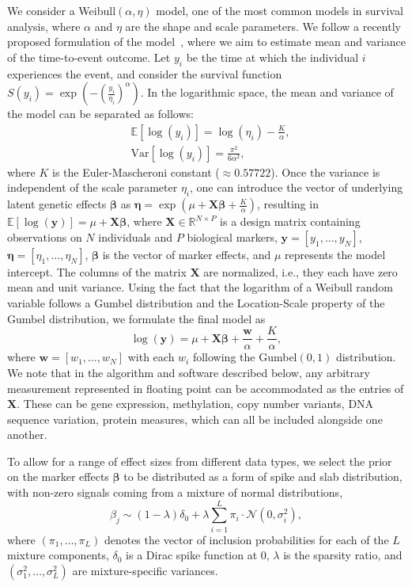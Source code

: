 We consider a Weibull$(\alpha, \eta)$ model, one of the most common models in survival analysis, where $\alpha$ and $\eta$ are the shape and scale parameters. We follow a recently proposed formulation of the model~\cite{Ojavee2021-zu}, where we aim to estimate mean and variance of the time-to-event outcome. Let $y_i$ be the time at which the individual $i$ experiences the event, and consider the survival function $S(y_i) = \exp(-(\frac{y_i}{\eta_i})^{\alpha})$. In the logarithmic space, the mean and variance of the model can be separated as follows:
\begin{align}
    & \mathbb{E}[\log(y_i)] = \log(\eta_i) - \frac{K}{\alpha}, \\
    & \text{Var}[\log(y_i)] = \frac{\pi^2}{6 \alpha^2},
\end{align}
where $K$ is the Euler-Mascheroni constant ($\approx 0.57722$). Once the variance is independent of the scale parameter $\eta_i$, one can introduce the vector of underlying latent genetic effects $\bm{\beta}$ as $\bm{\eta} = \exp(\mu + \bm{X} \bm{\beta} + \frac{K}{\alpha})$, resulting in $\mathbb{E}[\log(\bm{y})] = \mu + \bm{X} \bm{\beta}$, where $\bm{X} \in \mathbb{R}^{N \times P}$ is a design matrix containing observations on $N$ individuals and $P$ biological markers, $\bm{y}=[y_1, \ldots, y_N]$, $\bm{\eta}=[\eta_1, \ldots, \eta_N]$, $\bm{\beta}$ is the vector of marker effects, and $\mu$ represents the model intercept. The columns of the matrix $\bm{X}$ are normalized, i.e., they each have zero mean and unit variance. Using the fact that the logarithm of a Weibull random variable follows a Gumbel distribution and the Location-Scale property of the Gumbel distribution, we formulate the final model as
\begin{equation}
    \label{eq:vampW_model}
    \log (\bm{y} )=\mu + \bm{X} \bm{\beta} + \frac{\bm{w}}{\alpha} + \frac{K}{\alpha}, 
\end{equation}
where $\bm{w} = [w_1, \dots, w_N]$ with each $w_i$ following the Gumbel$(0,1)$ distribution. We note that in the algorithm and software described below, any arbitrary measurement represented in floating point can be accommodated as the entries of $\bm{X}$. These can be gene expression, methylation, copy number variants, DNA sequence variation, protein measures, which can all be included alongside one another. 

To allow for a range of effect sizes from different data types, we select the prior on the marker effects $\bm{\beta}$ to be distributed as a form of spike and slab distribution, with non-zero signals coming from a mixture of normal distributions,
\begin{equation}
\label{eq:prior}
    \beta_j \sim ( 1 - \lambda ) \delta_0 + \lambda \sum^L_{i=1} \pi_i \cdot \mathcal{N}(0, \sigma^2_i),
\end{equation}
where $(\pi_1, \dots, \pi_L)$ denotes the vector of inclusion probabilities for each of the $L$ mixture components, $\delta_0$ is a Dirac spike function at 0, $\lambda$ is the sparsity ratio, and $(\sigma^2_1, \dots, \sigma^2_L)$ are mixture-specific variances.

